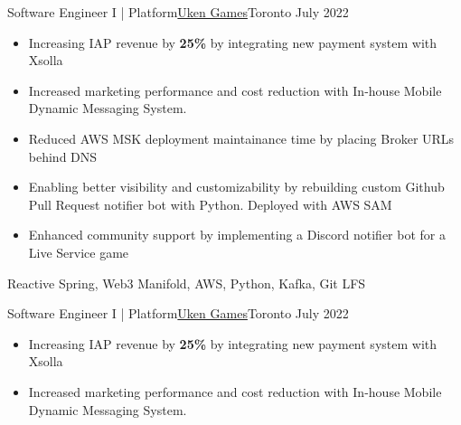 %
%
%
\begin{experiences}
  \experienceCurrent
    {Software Engineer I | Platform}{\href{https://uken.com}{Uken Games}}{Toronto}
    {July 2022} {
                    \begin{itemize}
                        \setlength\itemsep{0.2em}
                        \item Increasing IAP revenue by \textbf{25\%} by integrating new payment system with Xsolla 

                        \item Increased marketing performance and cost reduction with In-house Mobile Dynamic Messaging System.
                        
                        \item Reduced AWS MSK deployment maintainance time by placing Broker URLs behind DNS

                        \item Enabling better visibility and customizability by rebuilding custom Github Pull Request notifier bot with Python. Deployed with AWS SAM

                        \item Enhanced community support by implementing a Discord notifier bot for a Live Service game
                    \end{itemize}
                    }
                    {Reactive Spring, Web3 Manifold, AWS, Python, Kafka, Git LFS}

  \experienceCurrent  
    {Software Engineer I | Platform}{\href{https://uken.com}{Uken Games}}{Toronto}
    {July 2022} {
                    \begin{itemize}
                        \setlength\itemsep{0.2em}
                        \item Increasing IAP revenue by \textbf{25\%} by integrating new payment system with Xsolla 

                        \item Increased marketing performance and cost reduction with In-house Mobile Dynamic Messaging System.
                        

\end{itemize}}
\end{experiences}
